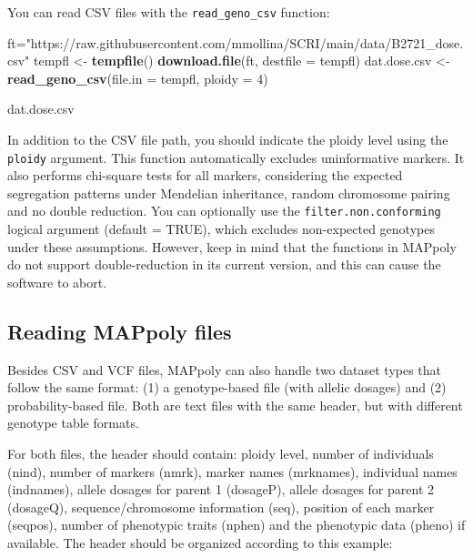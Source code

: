 \documentclass[
]{article}
\newenvironment{Shaded}{}{}
\newcommand{\DataTypeTok}[1]{\textcolor[rgb]{0.56,0.13,0.00}{#1}}
\newcommand{\DecValTok}[1]{\textcolor[rgb]{0.25,0.63,0.44}{#1}}
\newcommand{\KeywordTok}[1]{\textcolor[rgb]{0.00,0.44,0.13}{\textbf{#1}}}
\newcommand{\NormalTok}[1]{#1}
\newcommand{\StringTok}[1]{\textcolor[rgb]{0.25,0.44,0.63}{#1}}
\begin{document}
You can read CSV files with the \texttt{read\_geno\_csv} function:

\begin{Shaded}
\begin{Highlighting}[]
\NormalTok{ft=}\StringTok{"https://raw.githubusercontent.com/mmollina/SCRI/main/data/B2721_dose.csv"}
\NormalTok{tempfl <-}\StringTok{ }\KeywordTok{tempfile}\NormalTok{()}
\KeywordTok{download.file}\NormalTok{(ft, }\DataTypeTok{destfile =}\NormalTok{ tempfl)}
\NormalTok{dat.dose.csv <-}\StringTok{ }\KeywordTok{read_geno_csv}\NormalTok{(}\DataTypeTok{file.in  =}\NormalTok{ tempfl, }\DataTypeTok{ploidy =} \DecValTok{4}\NormalTok{)}
\end{Highlighting}
\end{Shaded}

\begin{Shaded}
\begin{Highlighting}[]
\NormalTok{dat.dose.csv}
\end{Highlighting}
\end{Shaded}

In addition to the CSV file path, you should indicate the ploidy level
using the \texttt{ploidy} argument. This function automatically excludes
uninformative markers. It also performs chi-square tests for all
markers, considering the expected segregation patterns under Mendelian
inheritance, random chromosome pairing and no double reduction. You can
optionally use the \texttt{filter.non.conforming} logical argument
(default = TRUE), which excludes non-expected genotypes under these
assumptions. However, keep in mind that the functions in MAPpoly do not
support double-reduction in its current version, and this can cause the
software to abort.

\hypertarget{reading-mappoly-files}{%
\subsection{Reading MAPpoly files}\label{reading-mappoly-files}}

Besides CSV and VCF files, MAPpoly can also handle two dataset types
that follow the same format: (1) a genotype-based file (with allelic
dosages) and (2) probability-based file. Both are text files with the
same header, but with different genotype table formats.

For both files, the header should contain: ploidy level, number of
individuals (nind), number of markers (nmrk), marker names (mrknames),
individual names (indnames), allele dosages for parent 1 (dosageP),
allele dosages for parent 2 (dosageQ), sequence/chromosome information
(seq), position of each marker (seqpos), number of phenotypic traits
(nphen) and the phenotypic data (pheno) if available. The header should
be organized according to this example:
\end{document}
